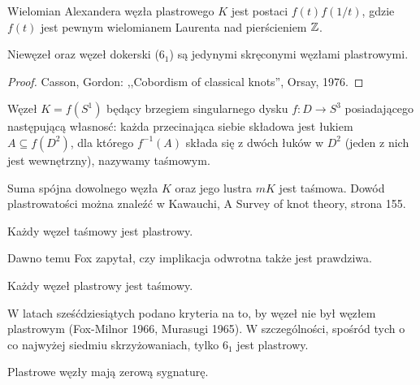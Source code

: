 \begin{proposition}
    Wielomian Alexandera węzła plastrowego $K$ jest postaci $f(t) f(1/t)$, gdzie $f(t)$ jest pewnym wielomianem Laurenta nad pierścieniem $\mathbb Z$.
\end{proposition}

\begin{theorem}
    Niewęzeł oraz węzeł dokerski ($6_1$) są jedynymi skręconymi węzłami plastrowymi.
\end{theorem}

\begin{proof}
    Casson, Gordon: ,,Cobordism of classical knots'', Orsay, 1976.
\end{proof}

\begin{definition}
    Węzeł $K = f(S^1)$ będący brzegiem singularnego dysku $f \colon D \to S^3$ posiadającego następującą własnosć: każda przecinająca siebie składowa jest łukiem $A \subseteq f(D^2)$, dla którego $f^{-1}(A)$ składa się z dwóch łuków w $D^2$ (jeden z nich jest wewnętrzny), nazywamy taśmowym. 
\end{definition}

Suma spójna dowolnego węzła $K$ oraz jego lustra $mK$ jest taśmowa.
Dowód plastrowatości można znaleźć w Kawauchi, A Survey of knot theory, strona 155.

\begin{proposition}
    Każdy węzeł taśmowy jest plastrowy.
\end{proposition}

Dawno temu Fox zapytał, czy implikacja odwrotna także jest prawdziwa.

\begin{conjecture}[Fox, 1958]
    Każdy węzeł plastrowy jest taśmowy.
\end{conjecture}

W latach sześćdziesiątych podano kryteria na to, by węzeł nie był węzłem plastrowym (Fox-Milnor 1966, Murasugi 1965).
W szczególności, spośród tych o co najwyżej siedmiu skrzyżowaniach, tylko $6_1$ jest plastrowy.


\begin{proposition} \label{slice_signature}
    Plastrowe węzły mają zerową sygnaturę.
\end{proposition}


